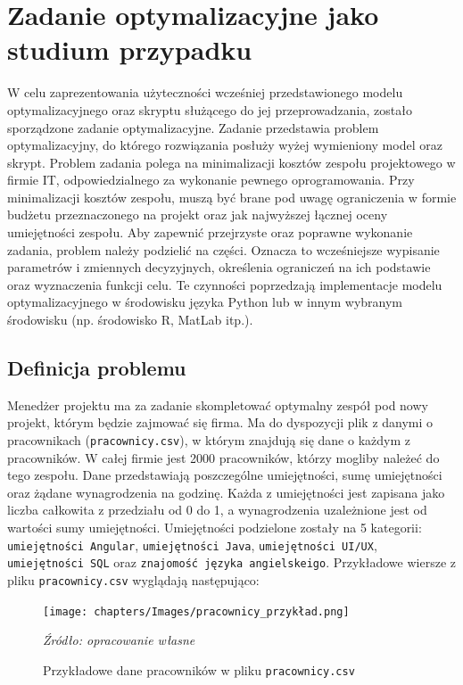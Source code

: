 \section{Zadanie optymalizacyjne jako studium przypadku} \label{sec:studium}
\par W celu zaprezentowania użyteczności wcześniej przedstawionego modelu optymalizacyjnego oraz skryptu służącego do jej przeprowadzania, zostało sporządzone zadanie optymalizacyjne. Zadanie przedstawia problem optymalizacyjny, do którego rozwiązania posłuży wyżej wymieniony model oraz skrypt. Problem zadania polega na minimalizacji kosztów zespołu projektowego w firmie IT, odpowiedzialnego za wykonanie pewnego oprogramowania. Przy minimalizacji kosztów zespołu, muszą być brane pod uwagę ograniczenia w formie budżetu przeznaczonego na projekt oraz jak najwyższej łącznej oceny umiejętności zespołu. Aby zapewnić przejrzyste oraz poprawne wykonanie zadania, problem należy podzielić na części. Oznacza to wcześniejsze wypisanie parametrów i zmiennych decyzyjnych, określenia ograniczeń na ich podstawie oraz wyznaczenia funkcji celu. Te czynności poprzedzają implementacje modelu optymalizacyjnego w środowisku języka Python lub w innym wybranym środowisku (np. środowisko R, MatLab itp.).

    \subsection{Definicja problemu}\label{subsec:problem}
    \par Menedżer projektu ma za zadanie skompletować optymalny zespół pod nowy projekt, którym będzie zajmować się firma. Ma do dyspozycji plik z danymi o pracownikach (\verb|pracownicy.csv|), w którym znajdują się dane o każdym z pracowników. W całej firmie jest 2000 pracowników, którzy mogliby należeć do tego zespołu. Dane przedstawiają poszczególne umiejętności, sumę umiejętności oraz żądane wynagrodzenia na godzinę. Każda z umiejętności jest zapisana jako liczba całkowita z przedziału od 0 do 1, a wynagrodzenia uzależnione jest od wartości sumy umiejętności. Umiejętności podzielone zostały na 5 kategorii: \verb|umiejętności Angular|, \verb|umiejętności Java|, \verb|umiejętności UI/UX|, \verb|umiejętności SQL| oraz \verb|znajomość języka angielskeigo|. Przykładowe wiersze z pliku \verb|pracownicy.csv| wyglądają następująco:
    \begin{figure}[H]
        \centering
        \texttt{[image: chapters/Images/pracownicy\_przykład.png]}
        \cprotect\caption{Przykładowe dane pracowników w pliku \verb|pracownicy.csv|}
        \textit{Źródło: opracowanie własne} 
    \end{figure}

